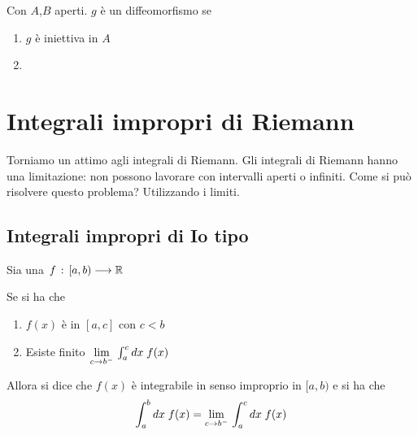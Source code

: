 Con $A$,$B$ aperti. $g$ è un diffeomorfismo se
\begin{enumerate}
	\item $g$ è iniettiva in $A$
	\item															
\end{enumerate}

\newpage

\section{Integrali impropri di Riemann}

Torniamo un attimo agli integrali di Riemann. Gli integrali di Riemann hanno una limitazione: non possono lavorare con intervalli aperti o infiniti. Come si può risolvere questo problema? Utilizzando i limiti.

\subsection{Integrali impropri di Io tipo}

Sia una $f \, : \, [a,b) \longrightarrow \mathbb{R}$

Se si ha che
\begin{enumerate}
	\item $f(x)$ è \Rint in $[a,c]$ con $c<b$
	\item Esiste finito $\underset{c \rightarrow b^-}{\lim} \, \int_{a}^{c} dx \; f(x)$ 
\end{enumerate}

Allora si dice che $f(x)$ è integrabile in senso improprio in $[a,b)$ e si ha che
\begin{align}
	\int_{a}^{b} dx \; f(x)=\underset{c \rightarrow b^-}{\lim} \, \int_{a}^{c} dx \; f(x)
\end{align}

\begin{figure}[!htb]
\end{figure}

